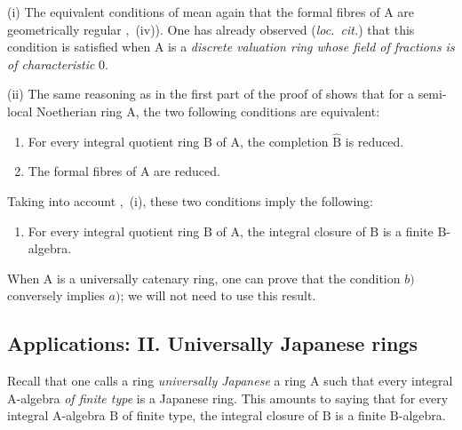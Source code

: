 \begin{remarks}[7.6.7]
\label{IV.7.6.7}
(i) The equivalent conditions of  mean again that the formal fibres of $\mathrm{A}$ are geometrically regular ,~(iv)). One has already observed (\emph{loc.\ cit.}) that this condition is satisfied when $\mathrm{A}$ is a \emph{discrete valuation ring whose field of fractions is of characteristic} $0$.

(ii) The same reasoning as in the first part of the proof of  shows that for a semi-local Noetherian ring $\mathrm{A}$, the two following conditions are equivalent:
\begin{enumerate}[label=\emph{\alph*)}]
  \item For every integral quotient ring $\mathrm{B}$ of $\mathrm{A}$, the completion $\widehat{\mathrm{B}}$ is reduced.
  \item[\rm a$'$)] The formal fibres of $\mathrm{A}$ are reduced.
\end{enumerate}
Taking into account ,~(i), these two conditions imply the following:
\begin{enumerate}[label=\emph{\alph*)}]
  \item[b)] For every integral quotient ring $\mathrm{B}$ of $\mathrm{A}$, the integral closure of $\mathrm{B}$ is a finite $\mathrm{B}$-algebra.
\end{enumerate}
When $\mathrm{A}$ is a universally catenary ring, one can prove that the condition $b)$ conversely implies $a)$; we will not need to use this result.
\end{remarks}


\subsection{Applications: II. Universally Japanese rings}
\label{subsection:IV.7.7}

\begin{env}[7.7.1]
\label{IV.7.7.1}
Recall  that one calls a ring \emph{universally Japanese} a ring $\mathrm{A}$ such that every integral $\mathrm{A}$-algebra \emph{of finite type} is a Japanese ring. This amounts to saying that for every integral $\mathrm{A}$-algebra $\mathrm{B}$ of finite type, the integral closure of $\mathrm{B}$ is a finite $\mathrm{B}$-algebra.
\end{env}

